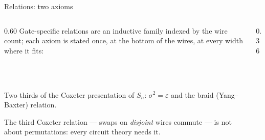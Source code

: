 \begin{frame}{Relations: two axioms \InPaper}
\begin{columns}[c]
\begin{column}{0.60\textwidth}
Gate-specific relations are an inductive family indexed by the wire count;
each axiom is stated \alert{once}, at the bottom of the wires, at every width
where it fits:
\begin{code}%
\>[0]\AgdaSpace{}%
\AgdaSpace{}%
\AgdaSymbol{:}\AgdaSpace{}%
\AgdaSymbol{(}\AgdaSpace{}%
\AgdaSymbol{:}\AgdaSpace{}%
\AgdaSymbol{)}\AgdaSpace{}%
\AgdaSpace{}%
\AgdaSpace{}%
\AgdaSymbol{(}\AgdaSpace{}%
\AgdaSymbol{)}\AgdaSpace{}%
\<%
\\
\>[0][@{}l@{\AgdaIndent{0}}]%
\>[2]%
\>[14]\AgdaSymbol{:}\AgdaSpace{}%
\AgdaSymbol{(}\AgdaSpace{}%
\AgdaSymbol{)}\AgdaSpace{}%
\AgdaSpace{}%
\AgdaSpace{}%
\AgdaSpace{}%
\AgdaSpace{}%
\AgdaOperator{\AgdaDatatype{===}}\AgdaSpace{}%
\<%
\\
%
\>[2]\AgdaSpace{}%
\AgdaSymbol{:}\AgdaSpace{}%
\AgdaSymbol{(}\AgdaSpace{}%
\AgdaSymbol{)}\AgdaSpace{}%
\AgdaSpace{}%
\AgdaSpace{}%
\AgdaSpace{}%
\AgdaSpace{}%
\AgdaSpace{}%
\AgdaSpace{}%
\AgdaSpace{}%
\AgdaOperator{\AgdaDatatype{===}}\AgdaSpace{}%
\AgdaSpace{}%
\AgdaSpace{}%
\AgdaSpace{}%
\AgdaSpace{}%
\AgdaSpace{}%
\AgdaSpace{}%
\<%
\end{code}
\vspace{4pt}
Two thirds of the \alert{Coxeter presentation} of $S_n$:
$\sigma^2=\varepsilon$ and the braid (Yang--Baxter) relation.

\vspace{4pt}
\small The third Coxeter relation --- swaps on \emph{disjoint} wires commute ---
is not about permutations: every circuit theory needs it.
\end{column}
\begin{column}{0.36\textwidth}
\centering
{}\\[2pt]
\\[12pt]
\\[2pt]
\end{column}
\end{columns}
\end{frame}

